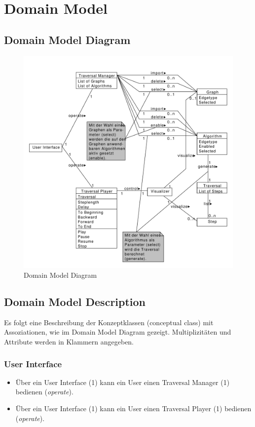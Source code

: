 \section{Domain Model}
\label{sec:Domain Model}
% 
\subsection{Domain Model Diagram}
\label{subsec:Domain Model Diagram}
\begin{figure}[H]
    \includegraphics[totalheight=0.55\textheight]{diagrams/domain-model-diagram.pdf}
    \caption{Domain Model Diagram}
    \label{fig:domain_model_diagram}
\end{figure}
% 
\subsection{Domain Model Description}
\label{subsec:Domain Model Description}
Es folgt eine Beschreibung der Konzeptklassen (conceptual class) mit Assoziationen, wie im Domain Model Diagram gezeigt. Multiplizit\"aten und Attribute werden in Klammern angegeben.
% 
\subsubsection{User Interface}
\label{subsubsec:User Interface}
\begin{itemize}
  \item \"Uber ein User Interface (1) kann ein User einen Traversal Manager (1) bedienen (\textit{operate}).
  \item \"Uber ein User Interface (1) kann ein User einen Traversal Player (1) bedienen (\textit{operate}).
\end{itemize}
% 
